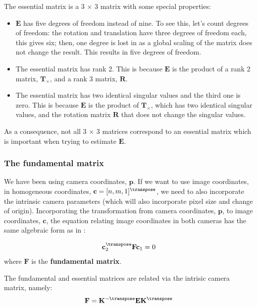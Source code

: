 The essential matrix is a 3 $\times$ 3 matrix with some special properties: 
\begin{itemize}
\item $\mathbf{E}$ has five degrees of freedom instead of nine. To see this, let's count degrees of freedom: the rotation and translation have three degrees of freedom each, this gives six; then, one degree is lost in \eqn{\ref{eq:relation4}} as a global scaling of the matrix does not change the result. This results in five degrees of freedom. 

\item The essential matrix has rank 2. This is because $\mathbf{E}$ is the product of a rank 2 matrix, $\mathbf{T}_{\times}$, and a rank 3 matrix, $\mathbf{R}$.  

\item The essential matrix has two identical singular values and the third one is zero. This is because $\mathbf{E}$ is the product of $\mathbf{T}_{\times}$, which has two identical singular values, and the rotation matrix $\mathbf{R}$ that does not change the singular values.
\end{itemize}
As a consequence, not all 3 $\times$ 3 matrices correspond to an essential matrix which is important when trying to estimate $\mathbf{E}$.


\subsubsection{The fundamental matrix} 
We have been using camera coordinates, $\mathbf{p}$. If we want to use image coordinates, in homogeneous coordinates, $\mathbf{c}=[n,m,1]^\transpose$, we need to also incorporate the intrinsic camera parameters (which will also incorporate pixel size and change of origin). Incorporating the transformation from camera coordinates, $\mathbf{p}$, to image coordinates, $\mathbf{c}$, the equation relating image coordinates in both cameras has the same algebraic form as in \eqn{\ref{eq:relation4}}:

\begin{equation}
\mathbf{c}_2^\transpose \mathbf{F} \mathbf{c}_1 = 0
\end{equation}
where $\mathbf{F}$ is the {\bf fundamental matrix}.

The fundamental and essential matrices are related via the intrisic camera matrix, namely:
\begin{equation}
\mathbf{F} = \mathbf{K}^{-\transpose} \mathbf{E} \mathbf{K}^{\transpose}
\end{equation}

